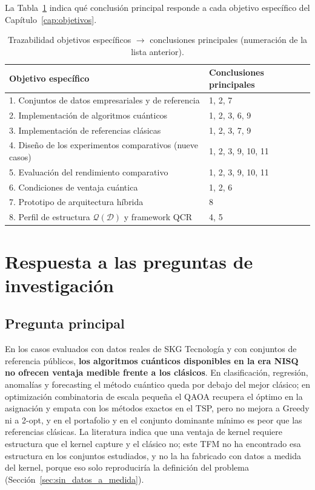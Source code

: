 La Tabla~\ref{tab:trazabilidad} indica qué conclusión principal responde a cada objetivo específico del Capítulo~\ref{cap:objetivos}.

\begin{table}[ht]
\centering
\small
\begin{tabular}{@{}p{}p{}@{}}
\toprule
\textbf{Objetivo específico} & \textbf{Conclusiones principales} \\
\midrule
1. Conjuntos de datos empresariales y de referencia & 1, 2, 7 \\
2. Implementación de algoritmos cuánticos & 1, 2, 3, 6, 9 \\
3. Implementación de referencias clásicas & 1, 2, 3, 7, 9 \\
4. Diseño de los experimentos comparativos (nueve casos) & 1, 2, 3, 9, 10, 11 \\
5. Evaluación del rendimiento comparativo & 1, 2, 3, 9, 10, 11 \\
6. Condiciones de ventaja cuántica & 1, 2, 6 \\
7. Prototipo de arquitectura híbrida & 8 \\
8. Perfil de estructura $\mathcal{Q}(\mathcal{D})$ y framework QCR & 4, 5 \\
\bottomrule
\end{tabular}
\caption{Trazabilidad objetivos específicos $\rightarrow$ conclusiones principales (numeración de la lista anterior).}
\label{tab:trazabilidad}
\end{table}

\section{Respuesta a las preguntas de investigación}

\subsection*{Pregunta principal}

En los casos evaluados con datos reales de SKG Tecnología y con conjuntos de referencia públicos, \textbf{los algoritmos cuánticos disponibles en la era NISQ no ofrecen ventaja medible frente a los clásicos}. En clasificación, regresión, anomalías y forecasting el método cuántico queda por debajo del mejor clásico; en optimización combinatoria de escala pequeña el QAOA recupera el óptimo en la asignación y empata con los métodos exactos en el TSP, pero no mejora a Greedy ni a 2-opt, y en el portafolio y en el conjunto dominante mínimo es peor que las referencias clásicas. La literatura \citep{huang2021} indica que una ventaja de kernel requiere estructura que el kernel capture y el clásico no; este TFM no ha encontrado esa estructura en los conjuntos estudiados, y no la ha fabricado con datos a medida del kernel, porque eso solo reproduciría la definición del problema (Sección~\ref{sec:sin_datos_a_medida}).

